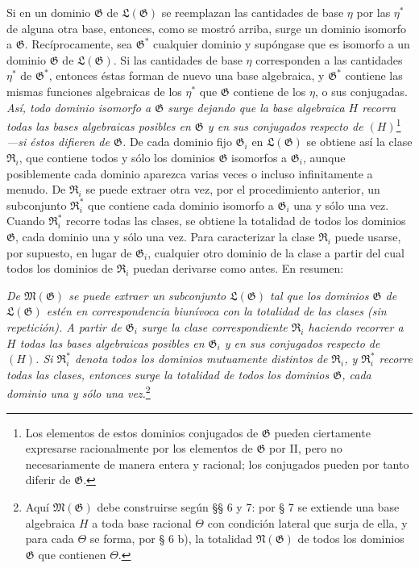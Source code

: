 \documentclass[11pt]{article}
\begin{document}
Si en un dominio $\mathfrak G$ de $\mathfrak L(\mathfrak G)$ se reemplazan las cantidades de base $\eta$ por las $\eta^*$ de alguna otra base, entonces, como se mostró arriba, surge un dominio isomorfo a $\mathfrak G$. Recíprocamente, sea $\mathfrak G^*$ cualquier dominio y supóngase que es isomorfo a un dominio $\mathfrak G$ de $\mathfrak L(\mathfrak G)$. Si las cantidades de base $\eta$ corresponden a las cantidades $\eta^*$ de $\mathfrak G^*$, entonces éstas forman de nuevo una base algebraica, y $\mathfrak G^*$ contiene las mismas funciones algebraicas de los $\eta^*$ que $\mathfrak G$ contiene de los $\eta$, o sus conjugadas. \emph{Así, todo dominio isomorfo a $\mathfrak G$ surge dejando que la base algebraica $H$ recorra todas las bases algebraicas posibles en $\mathfrak G$ y en sus conjugados respecto de $(H)$}\footnote{Los elementos de estos dominios conjugados de $\mathfrak G$ pueden ciertamente expresarse racionalmente por los elementos de $\mathfrak G$ por II, pero no necesariamente de manera entera y racional; los conjugados pueden por tanto diferir de $\mathfrak G$.} \emph{---si éstos difieren de $\mathfrak G$.} De cada dominio fijo $\mathfrak G_i$ en $\mathfrak L(\mathfrak G)$ se obtiene así la clase $\mathfrak R_i$, que contiene todos y sólo los dominios $\mathfrak G$ isomorfos a $\mathfrak G_i$, aunque posiblemente cada dominio aparezca varias veces o incluso infinitamente a menudo. De $\mathfrak R_i$ se puede extraer otra vez, por el procedimiento anterior, un subconjunto $\mathfrak R_i^*$ que contiene cada dominio isomorfo a $\mathfrak G_i$ una y sólo una vez. Cuando $\mathfrak R_i^*$ recorre todas las clases, se obtiene la totalidad de todos los dominios $\mathfrak G$, cada dominio una y sólo una vez. Para caracterizar la clase $\mathfrak R_i$ puede usarse, por supuesto, en lugar de $\mathfrak G_i$, cualquier otro dominio de la clase a partir del cual todos los dominios de $\mathfrak R_i$ puedan derivarse como antes. En resumen:

\emph{De $\mathfrak M(\mathfrak G)$ se puede extraer un subconjunto $\mathfrak L(\mathfrak G)$ tal que los dominios $\mathfrak G$ de $\mathfrak L(\mathfrak G)$ estén en correspondencia biunívoca con la totalidad de las clases (sin repetición). A partir de $\mathfrak G_i$ surge la clase correspondiente $\mathfrak R_i$ haciendo recorrer a $H$ todas las bases algebraicas posibles en $\mathfrak G_i$ y en sus conjugados respecto de $(H)$. Si $\mathfrak R_i^*$ denota todos los dominios mutuamente distintos de $\mathfrak R_i$, y $\mathfrak R_i^*$ recorre todas las clases, entonces surge la totalidad de todos los dominios $\mathfrak G$, cada dominio una y sólo una vez.}\footnote{Aquí $\mathfrak M(\mathfrak G)$ debe construirse según §§ 6 y 7: por § 7 se extiende una base algebraica $H$ a toda base racional $\Theta$ con condición lateral que surja de ella, y para cada $\Theta$ se forma, por § 6 b), la totalidad $\mathfrak N(\mathfrak G)$ de todos los dominios $\mathfrak G$ que contienen $\Theta$.}
\end{document}
